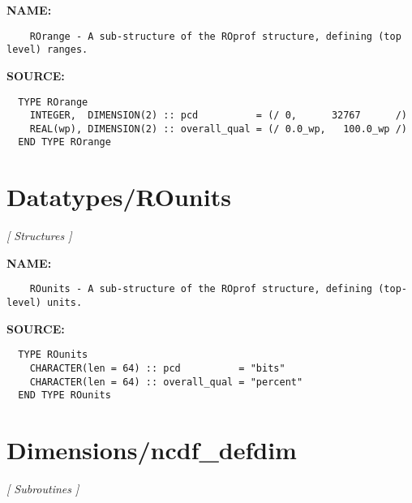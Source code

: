 \label{ch:robo54}
\label{ch:Datatypes_ROrange}
\textbf{NAME:}\hspace{0.08in}\begin{Verbatim}
    ROrange - A sub-structure of the ROprof structure, defining (top level) ranges.
\end{Verbatim}
\textbf{SOURCE:}\hspace{0.08in}\begin{Verbatim}
  TYPE ROrange
    INTEGER,  DIMENSION(2) :: pcd          = (/ 0,      32767      /)
    REAL(wp), DIMENSION(2) :: overall_qual = (/ 0.0_wp,   100.0_wp /)
  END TYPE ROrange
\end{Verbatim}
\section{Datatypes/ROunits}
\textsl{[ Structures ]}

\label{ch:robo55}
\label{ch:Datatypes_ROunits}
\textbf{NAME:}\hspace{0.08in}\begin{Verbatim}
    ROunits - A sub-structure of the ROprof structure, defining (top-level) units.
\end{Verbatim}
\textbf{SOURCE:}\hspace{0.08in}\begin{Verbatim}
  TYPE ROunits
    CHARACTER(len = 64) :: pcd          = "bits"
    CHARACTER(len = 64) :: overall_qual = "percent"
  END TYPE ROunits
\end{Verbatim}
\section{Dimensions/ncdf\_defdim}
\textsl{[ Subroutines ]}

